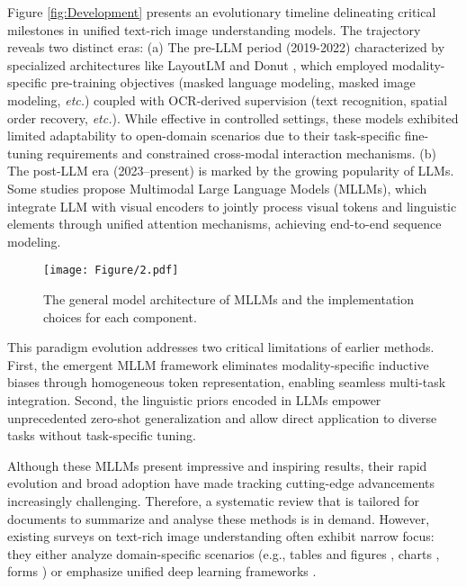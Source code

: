Figure \ref{fig:Development} presents an evolutionary timeline delineating critical milestones in unified text-rich image understanding models. The trajectory reveals two distinct eras: (a) The pre-LLM period (2019-2022) characterized by specialized architectures like LayoutLM \cite{Xu2019ARXIV_LayoutLM_Pre_training} and Donut \cite{Kim2021SEMANTIC_Donut_Document_Understanding}, which employed modality-specific pre-training objectives (masked language modeling, masked image modeling, \textit{etc.}) coupled with OCR-derived supervision (text recognition, spatial order recovery, \textit{etc.}). While effective in controlled settings, these models exhibited limited adaptability to open-domain scenarios due to their task-specific fine-tuning requirements and constrained cross-modal interaction mechanisms. (b) The post-LLM era (2023–present) is marked by the growing popularity of LLMs. Some studies propose Multimodal Large Language Models (MLLMs), which integrate LLM with visual encoders to jointly process visual tokens and linguistic elements through unified attention mechanisms, achieving end-to-end sequence modeling.

\begin{figure*}[t]
    \centering
    \texttt{[image: Figure/2.pdf]} 
    \vspace{-2em}
    \caption{The general model architecture of MLLMs and the implementation choices for each component.} 
    \label{fig:Architecture} 
    \vspace{-1em}
\end{figure*}

This paradigm evolution addresses two critical limitations of earlier methods. First, the emergent MLLM framework eliminates modality-specific inductive biases through homogeneous token representation, enabling seamless multi-task integration. Second, the linguistic priors encoded in LLMs empower unprecedented zero-shot generalization and allow direct application to diverse tasks without task-specific tuning. 

Although these MLLMs present impressive and inspiring results, their rapid evolution and broad adoption have made tracking cutting-edge advancements increasingly challenging. Therefore, a systematic review that is tailored for documents to summarize and analyse these methods is in demand. However, 
existing surveys on text-rich image understanding often exhibit narrow focus: they either analyze domain-specific scenarios (e.g., tables and figures \cite{huang2024detection}, charts \cite{Huang2024ARXIV_From_Pixels_to, alshetairy2024transformersutilizationchartunderstanding}, forms \cite{abdallah2024transformers}) or emphasize unified deep learning frameworks \cite{subramani2011survey,ding2024deep}.

